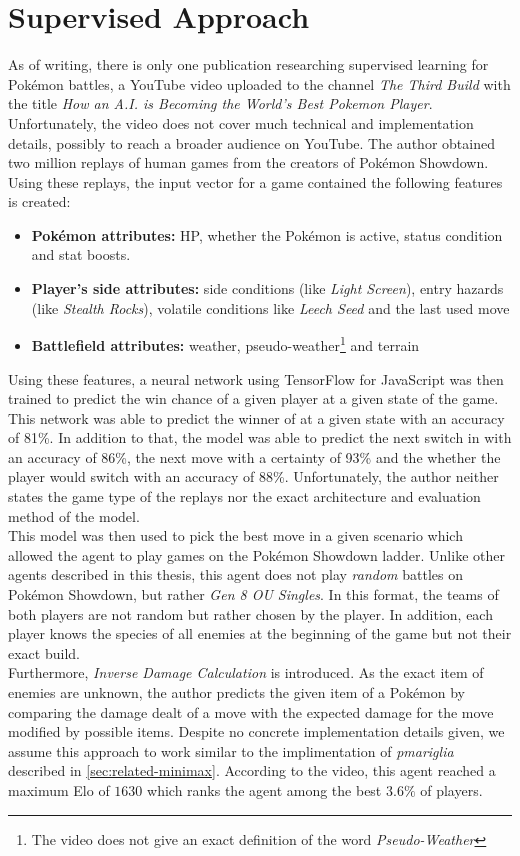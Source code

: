 \section{Supervised Approach}
As of writing, there is only one publication researching supervised learning for Pokémon battles,
a YouTube video uploaded to the channel \grqq\emph{The Third Build}\grqq{} with the title \grqq\emph{How an A.I. is
Becoming the World's Best Pokemon Player}\grqq{}\autocite{TheThirdBuild:PokemonAI}.
Unfortunately, the video does not cover much technical and implementation details, possibly to reach a 
broader audience on YouTube.
The author obtained two million 
replays of human games from the creators of Pokémon Showdown. Using these replays, the input vector for a game
contained the following features is created:
\begin{itemize}
    \item \textbf{Pokémon attributes:} \ac{HP}, whether the Pokémon is active, status condition and stat boosts.
    \item \textbf{Player's side attributes:} side conditions (like \textit{Light Screen}), entry hazards 
    (like \textit{Stealth Rocks}), volatile conditions like \textit{Leech Seed} and the last used move
    \item \textbf{Battlefield attributes:} weather, pseudo-weather\footnote{The video does not give an exact 
    definition of the word \textit{Pseudo-Weather}} and terrain
\end{itemize}
Using these features, a neural network using TensorFlow for JavaScript was then trained to predict the 
win chance of a given player at a given state of the game. This network was able to predict the winner
of at a given state with an accuracy of 81\%. In addition to that, the model was able to predict the next
switch in with an accuracy of 86\%, the next move with a certainty of 93\% and the whether the
player would switch with an accuracy of 88\%. Unfortunately, the author neither states the game type of
the replays nor the exact architecture and evaluation method of the model. \\
This model was then used to pick the best move in a given scenario which allowed the agent to play games
on the Pokémon Showdown ladder. Unlike other agents described in this thesis, this agent does not play
\emph{random} battles on Pokémon Showdown, but rather \emph{Gen 8 OU Singles}. In this format, the 
teams of both players are not random but rather chosen by the player. In addition, each player knows
the species of all enemies at the beginning of the game but not their exact build. \\
Furthermore, \textit{Inverse Damage Calculation} is introduced. As the exact item of 
enemies are unknown, the author predicts the given item of a Pokémon by comparing the damage dealt
of a move with the expected damage for the move modified by possible items. Despite no concrete 
implementation details given, we assume this approach to work similar to the implimentation 
of \emph{pmariglia} described in \ref{sec:related-minimax}.
According to the video, this agent reached a maximum Elo of $1630$ which ranks the agent among the 
best $3.6\%$ of players.